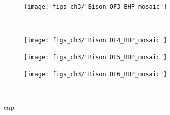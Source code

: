 \begin{figure}[h]\ContinuedFloat
    \begin{subfigure}[b]{\linewidth}
        \texttt{[image: figs\_ch3/"Bison OF3\_BHP\_mosaic"]}
        \label{fig:BP3_degform}
    \end{subfigure}\\[-4ex]
    \begin{subfigure}[b]{\linewidth}
    	\texttt{[image: figs\_ch3/"Bison OF4\_BHP\_mosaic"]}
        \label{fig:BP4_degform}
    \end{subfigure}
\end{figure}

\newpage

\begin{figure}[h]\ContinuedFloat
    \begin{subfigure}[b]{\linewidth}
        \texttt{[image: figs\_ch3/"Bison OF5\_BHP\_mosaic"]}
        \label{fig:BP5_degform}
    \end{subfigure}
    \begin{subfigure}[b]{\linewidth}
        \texttt{[image: figs\_ch3/"Bison OF6\_BHP\_mosaic"]}
        \label{fig:BP6_degform}
    \end{subfigure}\\[-4ex]

\caption[lot cap]{cap}
\label{fig:degree_formation_bison}
\end{figure}
\doublespace





